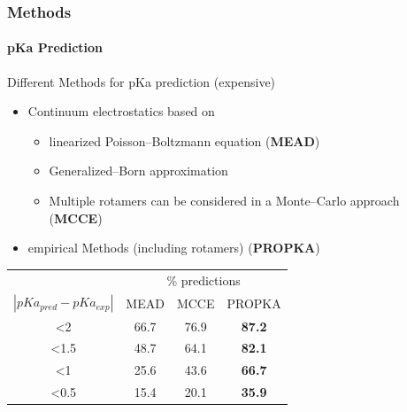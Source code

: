 \documentclass[english]{beamer}
\begin{document}
\begin{frame}
    \frametitle{Methods}
    \framesubtitle{pKa Prediction} 

    Different Methods for pKa prediction (expensive)
    \begin{itemize}
        \item Continuum electrostatics based on
        \begin{itemize}
            \item linearized Poisson--Boltzmann equation (\textbf{MEAD})
            \item Generalized--Born approximation
            \item Multiple rotamers can be considered in a Monte--Carlo approach (\textbf{MCCE})
        \end{itemize}

        \item empirical Methods (including rotamers) (\textbf{PROPKA})
    \end{itemize}

    \pause

    \begin{center}
    \begin{tabular}{ c c c c }
         & \multicolumn{3}{c}{\% predictions} \\
        $|pKa_{pred} - pKa_{exp}|$ & MEAD & MCCE & PROPKA \\
        \hline
        \hline
        <2   & 66.7 & 76.9 & \textbf{87.2} \\
        <1.5 & 48.7 & 64.1 & \textbf{82.1} \\
        <1   & 25.6 & 43.6 & \textbf{66.7} \\
        <0.5 & 15.4 & 20.1 & \textbf{35.9} \\
    \end{tabular}
    \end{center}

\end{frame}

\end{document}
